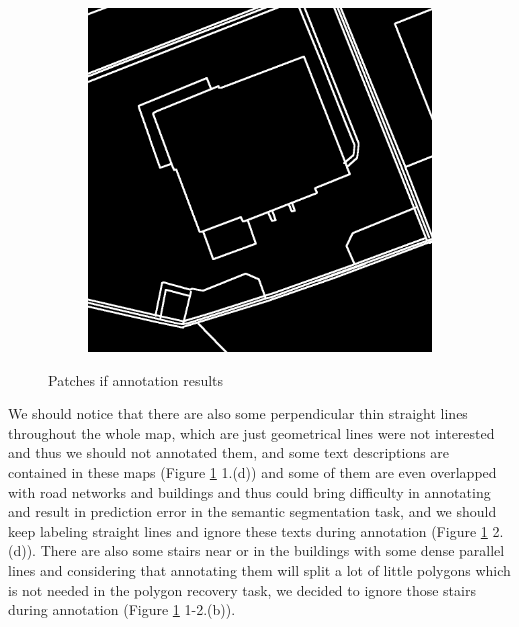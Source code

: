 \documentclass[12pt]{article}
\begin{document}
\begin{figure}[H]
\begin{subfigure}[b]{.235\textwidth}
\begin{minipage}[t]{1\linewidth}
		    \caption{ }
		\end{minipage}
	\end{subfigure}
	\begin{subfigure}[b]{.235\textwidth}
		\begin{minipage}[t]{1\linewidth}
			\centering
			\includegraphics[width=1\linewidth]{images/patches/gt7.png}
		    \caption{ }
		\end{minipage}
	\end{subfigure}
	
    \caption{Patches if annotation results}
    \label{fig:anno_res}
\end{figure}

We should notice that there are also some perpendicular thin straight lines throughout the whole map, which are just geometrical lines were not interested and thus we should not annotated them, and some text descriptions are contained in these maps (Figure \ref{fig:anno_res} 1.(d)) and some of them are even overlapped with road networks and buildings and thus could bring difficulty in annotating and result in prediction error in the semantic segmentation task, and we should keep labeling straight lines and ignore these texts during annotation (Figure \ref{fig:anno_res} 2.(d)). There are also some stairs near or in the buildings with some dense parallel lines and considering that annotating them will split a lot of little polygons which is not needed in the polygon recovery task, we decided to ignore those stairs during annotation (Figure \ref{fig:anno_res} 1-2.(b)).
\end{document}

